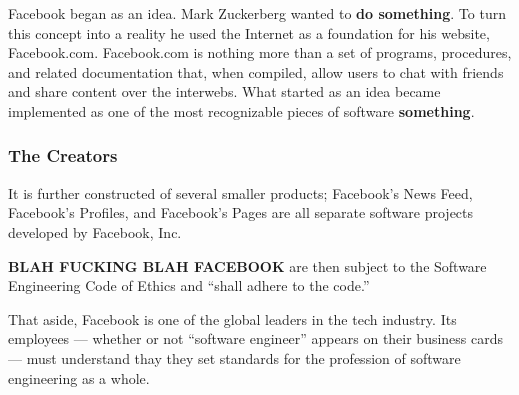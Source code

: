 \par Facebook began as an idea. Mark Zuckerberg wanted to \textbf{do something}. \citeneeded To turn this concept into a reality he used the Internet as a foundation for his website, Facebook.com. Facebook.com is nothing more than a set of programs, procedures, and related documentation that, when compiled, allow users to chat with friends and share content over the interwebs. What started as an idea became implemented as one of the most recognizable pieces of software \textbf{something}. \citeneeded


\subsubsection{The Creators}

% 
\par 

\par It is further constructed of several smaller products; Facebook's News Feed, Facebook's Profiles, and Facebook's Pages are all separate software projects developed by Facebook, Inc. \cite{fb_about}

\par 

\par \textbf{BLAH FUCKING BLAH FACEBOOK} are then subject to the Software Engineering Code of Ethics and ``shall adhere to the code.'' \cite{se_code}

\par That aside, Facebook is one of the global leaders in the tech industry. Its employees --- whether or not ``software engineer'' appears on their business cards --- must understand thay they set standards for the profession of software engineering as a whole.
